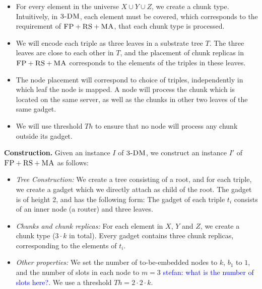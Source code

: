 \documentclass[9pt,twocolumn]{scrartcl}
\newcommand{\stefan}[1]{\textcolor{blue}{stefan: #1}}
\newcommand{\FP}{\textsc{FP}}
\newcommand{\RS}{\textsc{RS}}
\newcommand{\MA}{\textsc{MA}}
\newcommand{\Tree}{\ensuremath{T}}
\newcommand{\CostTrans}{\ensuremath{b_1}}
\newcommand{\TDM}{\textsc{3-DM}}
\newcommand{\Thr}{\ensuremath{Th}}
\begin{document}
 \begin{itemize}
 \item For every element in the universe $X\cup Y\cup
 Z$, we create a chunk type. Intuitively, in $\TDM$,
 each element must be covered, which corresponds to the requirement
 of $\FP+\RS+\MA$,
 that each chunk type is processed.

 \item We will encode each triple as three leaves in
 a substrate tree $\Tree$. The three leaves are close to each
 other in $\Tree$, and the placement of chunk replicas in $\FP+\RS+\MA$
 corresponds to the elements of the
 triples in these leaves.

 \item The node placement will correspond to choice of triples,
 independently in which leaf the node is mapped.
 A node will process the chunk which is located on the same server,
 as well as the chunks in other two leaves of the same gadget.

\item We will use threshold $\Thr$  to ensure that no node
will process
any chunk outside its gadget.
\end{itemize}

\textbf{Construction.}
Given an instance $I$ of $\TDM$, we construct an instance $I'$ of
$\FP+\RS+\MA$ as follows:
\begin{itemize}
\item \emph{Tree Construction:} We create a tree consisting of a root,
and for each triple, we create a gadget which we directly attach as
child of the root. The gadget is of height 2,
and has the following form:
The gadget of each triple $t_i$ consists of an inner node (a router) and three leaves.
\item \emph{Chunks and chunk replicas:} For each element in $X$, $Y$ and $Z$,
 we create a chunk type
($3 \cdot k$ in total). Every gadget
contains three chunk replicas, corresponding to the elements of $t_i$.
\item \emph{Other properties:} We set the number of to-be-embedded nodes to $k$,
$\CostTrans$ to $1$, and the number of slots in each node to $m=3$ \stefan{what
is the number of slots here?}. We use a threshold $\Thr=2 \cdot 2 \cdot k$.
\end{itemize}
\end{document}
